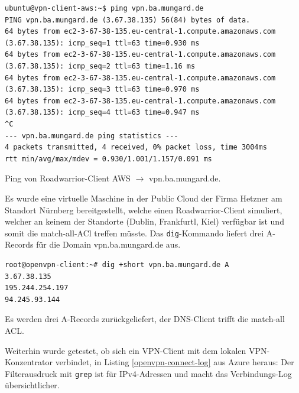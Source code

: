 \begin{listing}[h]
\begin{verbatim}
ubuntu@vpn-client-aws:~$ ping vpn.ba.mungard.de
PING vpn.ba.mungard.de (3.67.38.135) 56(84) bytes of data.
64 bytes from ec2-3-67-38-135.eu-central-1.compute.amazonaws.com (3.67.38.135): icmp_seq=1 ttl=63 time=0.930 ms
64 bytes from ec2-3-67-38-135.eu-central-1.compute.amazonaws.com (3.67.38.135): icmp_seq=2 ttl=63 time=1.16 ms
64 bytes from ec2-3-67-38-135.eu-central-1.compute.amazonaws.com (3.67.38.135): icmp_seq=3 ttl=63 time=0.970 ms
64 bytes from ec2-3-67-38-135.eu-central-1.compute.amazonaws.com (3.67.38.135): icmp_seq=4 ttl=63 time=0.947 ms
^C
--- vpn.ba.mungard.de ping statistics ---
4 packets transmitted, 4 received, 0% packet loss, time 3004ms
rtt min/avg/max/mdev = 0.930/1.001/1.157/0.091 ms

\end{verbatim}
\caption{Ping von Roadwarrior-Client AWS $\rightarrow$ vpn.ba.mungard.de.}
\label{ping-aws-ip}
\end{listing}\FloatBarrier
Es wurde eine virtuelle Maschine in der Public Cloud der Firma Hetzner am Standort Nürnberg bereitgestellt, welche einen Roadwarrior-Client simuliert, welcher an keinem der Standorte (Dublin, Frankfurtl, Kiel) verfügbar ist und somit die \glqq match-all\grqq-ACl treffen müsste. Das \texttt{dig}-Kommando liefert drei A-Records für die Domain vpn.ba.mungard.de aus.
\begin{listing}[h]
\begin{verbatim}
root@openvpn-client:~# dig +short vpn.ba.mungard.de A
3.67.38.135
195.244.254.197
94.245.93.144

\end{verbatim}
\caption{Es werden drei A-Records zurückgeliefert, der DNS-Client trifft die match-all ACL.}
\label{dig-match-all}
\end{listing}\FloatBarrier
\newpage
Weiterhin wurde getestet, ob sich ein VPN-Client mit dem lokalen VPN-Konzentrator verbindet, in Listing \ref{openvpn-connect-log} aus Azure heraus:
Der Filterausdruck mit \texttt{grep} ist für IPv4-Adressen und macht das Verbindungs-Log übersichtlicher.
